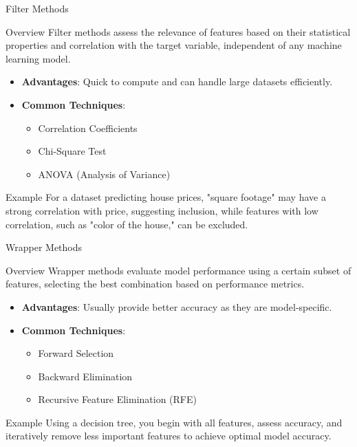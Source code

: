 \documentclass[aspectratio=169]{beamer}
\begin{document}
\begin{frame}[fragile]{Filter Methods}
    \begin{block}{Overview}
        Filter methods assess the relevance of features based on their statistical properties and correlation with the target variable, independent of any machine learning model.
    \end{block}
    
    \begin{itemize}
        \item \textbf{Advantages}: Quick to compute and can handle large datasets efficiently.
        \item \textbf{Common Techniques}:
        \begin{itemize}
            \item Correlation Coefficients
            \item Chi-Square Test
            \item ANOVA (Analysis of Variance)
        \end{itemize}
    \end{itemize}
    \begin{block}{Example}
        For a dataset predicting house prices, "square footage" may have a strong correlation with price, suggesting inclusion, while features with low correlation, such as "color of the house," can be excluded.
    \end{block}
\end{frame}

\begin{frame}[fragile]{Wrapper Methods}
    \begin{block}{Overview}
        Wrapper methods evaluate model performance using a certain subset of features, selecting the best combination based on performance metrics.
    \end{block}
    
    \begin{itemize}
        \item \textbf{Advantages}: Usually provide better accuracy as they are model-specific.
        \item \textbf{Common Techniques}:
        \begin{itemize}
            \item Forward Selection
            \item Backward Elimination
            \item Recursive Feature Elimination (RFE)
        \end{itemize}
    \end{itemize}
    \begin{block}{Example}
        Using a decision tree, you begin with all features, assess accuracy, and iteratively remove less important features to achieve optimal model accuracy.
    \end{block}
\end{frame}
\end{document}
